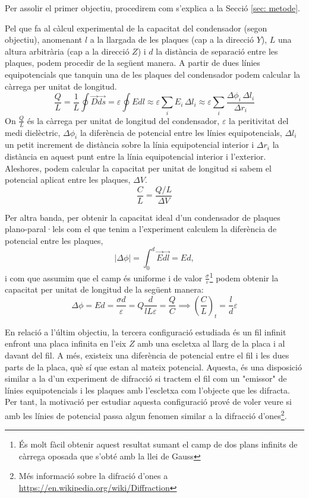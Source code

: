 \documentclass[11pt]{article}
\numberwithin{equation}{section}
\numberwithin{figure}{section}
\numberwithin{table}{section}
\begin{document}
Per assolir el primer objectiu, procedirem com s'explica a la Secció \ref{sec: metode}.

Pel que fa al càlcul experimental de la capacitat del condensador (segon objectiu), anomenant $l$ a la llargada de les plaques (cap a la direcció $Y$), $L$ una altura arbitrària (cap a la direcció $Z$) i $d$ la distància de separació entre les plaques, podem procedir de la següent manera.
A partir de dues línies equipotencials que tanquin una de les plaques del condensador podem calcular la càrrega per unitat de longitud.
\begin{equation}
    \frac{Q}{L} = \frac{1}{L}\oint\vec{D}\vec{ds}=\varepsilon\oint Edl\approx \varepsilon \sum_i E_i \, \Delta l_i \approx \varepsilon \sum_i \frac{\Delta \phi_i \, \Delta l_i}{\Delta r_i}
    \label{eq: Q}
\end{equation}
On $\frac{Q }{L }$ és la càrrega per unitat de longitud del condensador, $\varepsilon$ la peritivitat del medi dielèctric, $\Delta \phi_i$ la diferència de potencial entre les línies equipotencials, $\Delta l_i$ un petit increment de distància sobre la línia equipotencial interior i $\Delta r_i$ la distància en aquest punt entre la línia equipotencial interior i l'exterior.
Aleshores, podem calcular la capacitat per unitat de longitud si sabem el potencial aplicat entre les plaques, $\Delta V$.
\begin{equation}
    \frac{C}{L}=\frac{Q/L}{\Delta V}
    \label{eq: C}
\end{equation}

Per altra banda, per obtenir la capacitat ideal d'un condensador de plaques plano-paral·lels com el que tenim a l'experiment calculem la diferència de potencial entre les plaques,
\begin{equation}
    |\Delta\phi|=\int_{0}^{d} \vec{E}\vec{dl}= Ed,
\end{equation}
i com que assumim que el camp és uniforme i de valor $\frac{\sigma}{\varepsilon}$\footnote{És molt fàcil obtenir aquest resultat sumant el camp de dos plans infinits de càrrega oposada que s'obté amb la llei de Gauss} podem obtenir la capacitat per unitat de longitud de la següent manera:
\begin{equation}
    \Delta\phi=Ed=\frac{\sigma d}{\varepsilon}
    =Q\frac{d}{lL\varepsilon}=\frac{Q}{C}\implies (\frac{C}{L})_t=\frac{l}{d}\varepsilon
    \label{eq: c_t}
\end{equation}

En relació a l'últim objectiu, la tercera configuració estudiada és un fil infinit enfront una placa infinita en l'eix $Z$ amb una escletxa al llarg de la placa i al davant del fil. A més, existeix una diferència de potencial entre el fil i les dues parts de la placa, què sí que estan al mateix potencial. Aquesta, és una disposició similar a la d'un experiment de difracció si tractem el fil com un "emissor" de línies equipotencials i les plaques amb l'escletxa com l'objecte que les difracta. Per tant, la motivació per estudiar aquesta configuració prové de voler veure si amb les línies de potencial passa algun fenomen similar a la difracció d'ones\footnote{Més informació sobre la difració d'ones a \url{https://en.wikipedia.org/wiki/Diffraction}}.
\end{document}
